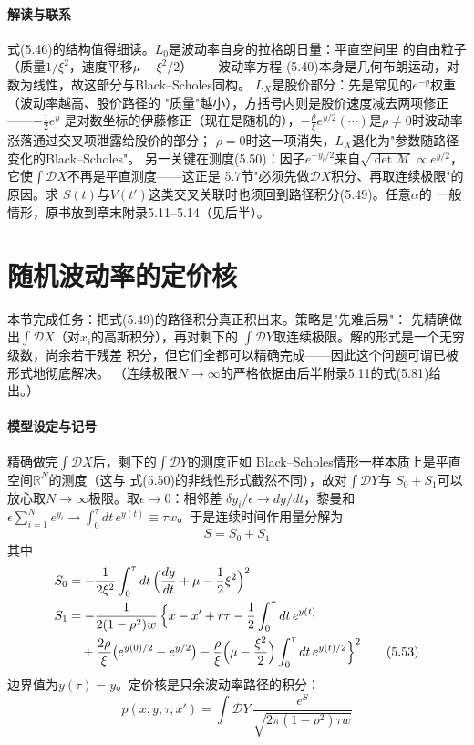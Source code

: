 \paragraph{解读与联系}
式(5.46)的结构值得细读。$L_{0}$是波动率自身的拉格朗日量：平直空间里
的自由粒子（质量$1/\xi^{2}$，速度平移$\mu-\xi^{2}/2$）——波动率方程
(5.40)本身是几何布朗运动，对数为线性，故这部分与Black--Scholes同构。
$L_{X}$是股价部分：先是常见的$e^{-y}$权重（波动率越高、股价路径的
"质量"越小），方括号内则是股价速度减去两项修正——$-\frac{1}{2}e^{y}$
是对数坐标的伊藤修正（现在是随机的），$-\frac{\rho}{\xi}e^{y/2}
(\cdots)$是$\rho\neq0$时波动率涨落通过交叉项泄露给股价的部分；
$\rho=0$时这一项消失，$L_{X}$退化为"参数随路径变化的Black--Scholes"。
另一关键在测度(5.50)：因子$e^{-y_{i}/2}$来自$\sqrt{\det\mathcal{M}}
\propto e^{y/2}$，它使$\int\mathcal{D}X$不再是平直测度——这正是
5.7节"必须先做$\mathcal{D}X$积分、再取连续极限"的原因。求
$S(t)$与$V(t')$这类交叉关联时也须回到路径积分(5.49)。任意$\alpha$的
一般情形，原书放到章末附录5.11--5.14（见后半）。

\section{随机波动率的定价核}

本节完成任务：把式(5.49)的路径积分真正积出来。策略是"先难后易"：
先精确做出$\int\mathcal{D}X$（对$x_{i}$的高斯积分），再对剩下的
$\int\mathcal{D}Y$取连续极限。解的形式是一个无穷级数，尚余若干残差
积分，但它们全都可以精确完成——因此这个问题可谓已被形式地彻底解决。
（连续极限$N\to\infty$的严格依据由后半附录5.11的式(5.81)给出。）

\paragraph{模型设定与记号}
精确做完$\int\mathcal{D}X$后，剩下的$\int\mathcal{D}Y$的测度正如
Black--Scholes情形一样本质上是平直空间$\mathbb{R}^{N}$的测度（这与
式(5.50)的非线性形式截然不同），故对$\int\mathcal{D}Y$与
$S_{0}+S_{1}$可以放心取$N\to\infty$极限。取$\epsilon\to0$：相邻差
$\delta y_{i}/\epsilon\to dy/dt$，黎曼和$\epsilon\sum_{i=1}^{N}e^{y_{i}}
\to\int_{0}^{\tau}dt\,e^{y(t)}\equiv\tau w$。于是连续时间作用量分解为
\begin{equation*}
S=S_{0}+S_{1}
\tag{5.52}
\end{equation*}
其中
\begin{align*}
S_{0}&=-\frac{1}{2\xi^{2}}\int_{0}^{\tau}dt\,
\Bigl(\frac{dy}{dt}+\mu-\frac{1}{2}\xi^{2}\Bigr)^{2}\\
S_{1}&=-\frac{1}{2(1-\rho^{2})w}\,\Bigl\{x-x'+r\tau
-\frac{1}{2}\int_{0}^{\tau}dt\,e^{y(t)}\\
&\quad+\frac{2\rho}{\xi}\bigl(e^{y(0)/2}-e^{y/2}\bigr)
-\frac{\rho}{\xi}\Bigl(\mu-\frac{\xi^{2}}{2}\Bigr)
\int_{0}^{\tau}dt\,e^{y(t)/2}\Bigr\}^{2}
\tag{5.53}
\end{align*}
边界值为$y(\tau)=y$。定价核是只余波动率路径的积分：
\begin{equation*}
p(x,y,\tau;x')=\int\mathcal{D}Y\,
\frac{e^{S}}{\sqrt{2\pi(1-\rho^{2})\tau w}}
\tag{5.54}
\end{equation*}

